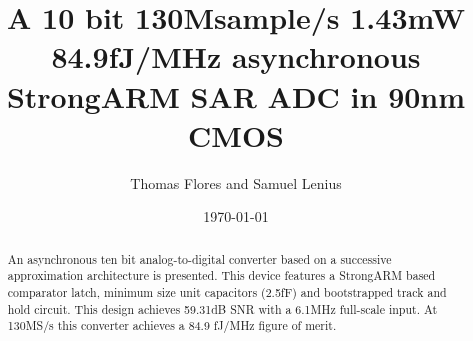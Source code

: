 \documentclass[10pt,journal]{IEEEtran}\usepackage{longtable}
\begin{document}




\title{A 10 bit 130Msample/s 1.43mW 84.9fJ/MHz asynchronous StrongARM SAR ADC in 90nm CMOS}
\author{Thomas Flores and Samuel Lenius}
\date{\today}
\maketitle

\begin{abstract}
An asynchronous ten bit analog-to-digital converter based on a successive approximation architecture is presented. This device features a StrongARM based comparator latch, minimum size unit capacitors (2.5fF) and bootstrapped track and hold circuit. This design achieves 59.31dB SNR with a 6.1MHz full-scale input. At 130MS/s this converter achieves a 84.9 fJ/MHz figure of merit.
\end{abstract}


\end{document}
